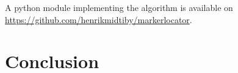 \documentclass{article}
\begin{document}
A python module implementing the algorithm is available on 
\url{https://github.com/henrikmidtiby/markerlocator}. 
\section{Conclusion} 
\printbibliography 
\end{document}
